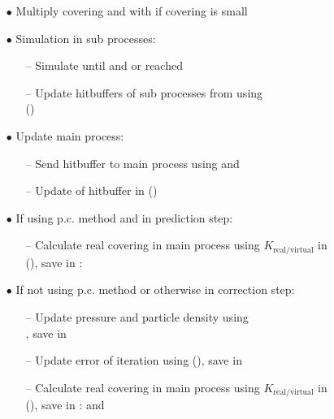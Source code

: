 \begin{itemize}[noitemsep,topsep=0pt, partopsep=0pt]
\begin{itemize}[noitemsep,topsep=0pt, partopsep=0pt]
	\item[$\bullet$] Multiply covering and  with  if covering is small
	\item[$\bullet$] Simulation in sub processes:
	\begin{itemize}[noitemsep,topsep=0pt, partopsep=0pt]
	\item[--] Simulate until  and  or  reached
	\item[--] Update hitbuffers of sub processes from  using \\()
	\end{itemize}
	\item[$\bullet$] Update main process:
		\begin{itemize}[noitemsep,topsep=0pt, partopsep=0pt]
		\item[--] Send hitbuffer to main process using  and 
		\item[--] Update of hitbuffer in  ()
		\end{itemize}
	\item[$\bullet$]{If using p.c. method and in prediction step:}
	\begin{itemize}[noitemsep,topsep=0pt, partopsep=0pt]
	\item[--] Calculate real covering in main process using $K_{\text{real}/\text{virtual}}$ in \\(), save in : 
	\end{itemize}
	\item[$\bullet$]{If not using p.c. method or otherwise in correction step:}
	\begin{itemize}[noitemsep,topsep=0pt, partopsep=0pt]
	\item [--] Update pressure and particle density using \\, save in 
	\item[--] Update error of iteration using  (), save in 
	\item[--] Calculate real covering in main process using $K_{\text{real}/\text{virtual}}$ in \\(), save in :  and 

\end{itemize}
\end{itemize}
\end{itemize}

